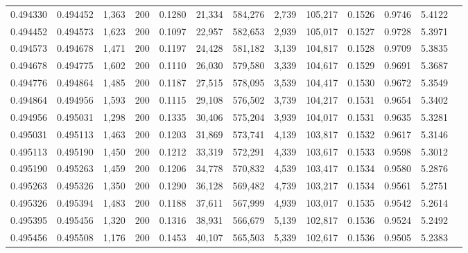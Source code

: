 \begin{tabular}{rrrrrrrrrrrrr}
0.494330 & 0.494452 & 1,363 & 200 &                                     0.1280 &  21,334 & 584,276 &   2,739 & 105,217 & 0.1526 & 0.9746 & 5.4122 \\
0.494452 & 0.494573 & 1,623 & 200 &                                     0.1097 &  22,957 & 582,653 &   2,939 & 105,017 & 0.1527 & 0.9728 & 5.3971 \\
0.494573 & 0.494678 & 1,471 & 200 &                                     0.1197 &  24,428 & 581,182 &   3,139 & 104,817 & 0.1528 & 0.9709 & 5.3835 \\
0.494678 & 0.494775 & 1,602 & 200 &                                     0.1110 &  26,030 & 579,580 &   3,339 & 104,617 & 0.1529 & 0.9691 & 5.3687 \\
0.494776 & 0.494864 & 1,485 & 200 &                                     0.1187 &  27,515 & 578,095 &   3,539 & 104,417 & 0.1530 & 0.9672 & 5.3549 \\
0.494864 & 0.494956 & 1,593 & 200 &                                     0.1115 &  29,108 & 576,502 &   3,739 & 104,217 & 0.1531 & 0.9654 & 5.3402 \\
0.494956 & 0.495031 & 1,298 & 200 &                                     0.1335 &  30,406 & 575,204 &   3,939 & 104,017 & 0.1531 & 0.9635 & 5.3281 \\
0.495031 & 0.495113 & 1,463 & 200 &                                     0.1203 &  31,869 & 573,741 &   4,139 & 103,817 & 0.1532 & 0.9617 & 5.3146 \\
0.495113 & 0.495190 & 1,450 & 200 &                                     0.1212 &  33,319 & 572,291 &   4,339 & 103,617 & 0.1533 & 0.9598 & 5.3012 \\
0.495190 & 0.495263 & 1,459 & 200 &                                     0.1206 &  34,778 & 570,832 &   4,539 & 103,417 & 0.1534 & 0.9580 & 5.2876 \\
0.495263 & 0.495326 & 1,350 & 200 &                                     0.1290 &  36,128 & 569,482 &   4,739 & 103,217 & 0.1534 & 0.9561 & 5.2751 \\
0.495326 & 0.495394 & 1,483 & 200 &                                     0.1188 &  37,611 & 567,999 &   4,939 & 103,017 & 0.1535 & 0.9542 & 5.2614 \\
0.495395 & 0.495456 & 1,320 & 200 &                                     0.1316 &  38,931 & 566,679 &   5,139 & 102,817 & 0.1536 & 0.9524 & 5.2492 \\
0.495456 & 0.495508 & 1,176 & 200 &                                     0.1453 &  40,107 & 565,503 &   5,339 & 102,617 & 0.1536 & 0.9505 & 5.2383 \\

\end{tabular}
